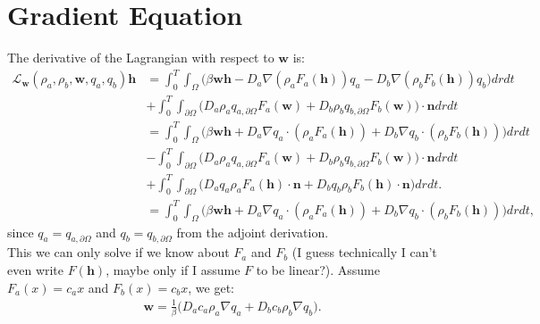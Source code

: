 \documentclass[11pt, a4paper]{article}
\theoremstyle{definition}
\newcommand{\adja}{q_a}
\newcommand{\adjb}{q_b}
\newcommand{\adjaB}{q_{a,\partial \Omega}}
\newcommand{\adjbB}{q_{b,\partial \Omega}}
\newcommand{\ra}{\rho_a}
\newcommand{\rb}{\rho_b}
\newcommand{\w}{\mathbf{w}}
\newcommand{\n}{\mathbf{n}}
\newcommand{\h}{\mathbf{h}}
\begin{document}
	\section{Gradient Equation}
	The derivative of the Lagrangian with respect to $\w$ is:
	\begin{align*}
	\mathcal{L}_{\w}(\ra,\rb, \w, \adja, \adjb) \h  &= \int_0^T \int_\Omega \bigg( \beta \w \h - D_a \nabla (\ra F_a(\h)) \adja - D_b \nabla (\rb F_b(\h)) \adjb \bigg)dr dt \\
	&+ \int_0^T \int_{\partial \Omega} \bigg( D_a \ra \adjaB F_a(\w)  + D_b \rb \adjbB F_b(\w)     \bigg) \cdot \n dr dt\\
	&= \int_0^T \int_\Omega \bigg( \beta \w \h + D_a \nabla  \adja \cdot (\ra F_a(\h)) 
	+ D_b \nabla \adjb \cdot (\rb F_b(\h)) \bigg)dr dt \\
	&- \int_0^T \int_{\partial \Omega} \bigg( D_a \ra \adjaB F_a(\w)  + D_b \rb \adjbB F_b(\w)     \bigg) \cdot \n dr dt\\
	&+ \int_0^T \int_{\partial \Omega} \bigg(D_a  \adja \ra F_a(\h) \cdot \n + D_b \adjb \rb F_b(\h) \cdot \n \bigg) dr dt.\\
	&= \int_0^T \int_\Omega \bigg( \beta \w \h + D_a \nabla  \adja \cdot (\ra F_a(\h)) 
	+ D_b \nabla \adjb \cdot (\rb F_b(\h)) \bigg)dr dt,
	\end{align*}
	since $\adja = \adjaB$ and $\adjb = \adjbB$ from the adjoint derivation.\\
	This we can only solve if we know about $F_a$ and $F_b$ (I guess technically I can't even write $F(\h)$, maybe only if I assume $F$ to be linear?). Assume $F_a(x) = c_a x$ and $F_b(x) = c_b x$, we get:
	\begin{align*}
	\w  = \frac{1}{\beta}\bigg( D_a c_a  \ra  \nabla \adja + D_b c_b \rb \nabla \adjb \bigg).
	\end{align*}	
	
	
	
	
	
	
	
	
	
	
	
	
\end{document}
